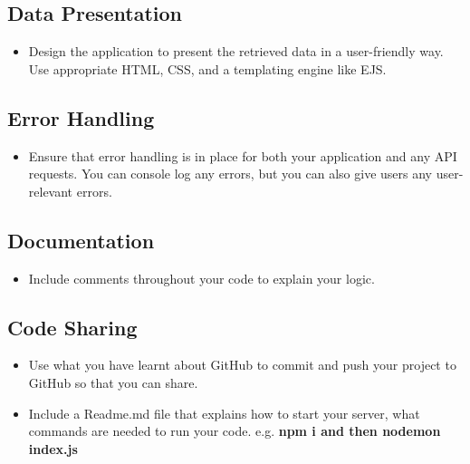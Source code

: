 \documentclass{article}
\begin{document}
\subsection{Data Presentation}
\begin{itemize}
  \item Design the application to present the retrieved data in a user-friendly way.
   Use appropriate HTML, CSS, and a templating engine like EJS.
\end{itemize}

\subsection{Error Handling}
\begin{itemize}
  \item Ensure that error handling is in place for both your application and any API 
  requests. You can console log any errors, but you can also give users any user-relevant errors.
\end{itemize}

\subsection{Documentation}
\begin{itemize}
  \item Include comments throughout your code to explain your logic.
\end{itemize}

\subsection{Code Sharing}
\begin{itemize}
  \item Use what you have learnt about GitHub to commit and push your 
    project to GitHub so that you can share.

  \item Include a Readme.md file that explains how to start your server, 
  what commands are needed to run your code. e.g.\textbf{ npm i  and then nodemon index.js}
\end{itemize}
\end{document}
